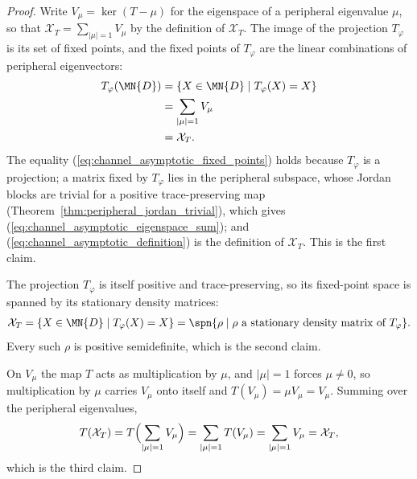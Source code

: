 \begin{proof}\leanok
    Write $V_\mu=\ker(T-\mu)$ for the eigenspace of a peripheral eigenvalue
    $\mu$, so that $\mathcal X_T=\sum_{|\mu|=1}V_\mu$ by the definition of
    $\mathcal X_T$. The image of the projection $T_\varphi$ is its set of
    fixed points, and the fixed points of $T_\varphi$ are the linear
    combinations of peripheral eigenvectors:
    \begin{align}
        T_\varphi(\MN{D})
         & =\{X\in\MN{D}\mid T_\varphi(X)=X\}
        \label{eq:channel_asymptotic_fixed_points}\\
         & =\sum_{|\mu|=1}V_\mu
        \label{eq:channel_asymptotic_eigenspace_sum}\\
         & =\mathcal X_T.
        \label{eq:channel_asymptotic_definition}
    \end{align}
    The equality (\ref{eq:channel_asymptotic_fixed_points}) holds because
    $T_\varphi$ is a projection; a matrix fixed by $T_\varphi$ lies in the
    peripheral subspace, whose Jordan blocks are trivial for a positive
    trace-preserving map (Theorem~\ref{thm:peripheral_jordan_trivial}),
    which gives (\ref{eq:channel_asymptotic_eigenspace_sum}); and
    (\ref{eq:channel_asymptotic_definition}) is the definition of
    $\mathcal X_T$. This is the first claim.

    The projection $T_\varphi$ is itself positive and trace-preserving, so its
    fixed-point space is spanned by its stationary density matrices:
    \begin{align}
        \mathcal X_T=\{X\in\MN{D}\mid T_\varphi(X)=X\}
        =\spn\{\rho\mid \rho\ \text{a stationary density matrix of }T_\varphi\}.
    \end{align}
    Every such $\rho$ is positive semidefinite, which is the second claim.

    On $V_\mu$ the map $T$ acts as multiplication by $\mu$, and $|\mu|=1$
    forces $\mu\neq0$, so multiplication by $\mu$ carries $V_\mu$ onto itself
    and $T(V_\mu)=\mu V_\mu=V_\mu$. Summing over the peripheral eigenvalues,
    \begin{align}
        T(\mathcal X_T)=T\Bigl(\sum_{|\mu|=1}V_\mu\Bigr)
        =\sum_{|\mu|=1}T(V_\mu)=\sum_{|\mu|=1}V_\mu=\mathcal X_T,
    \end{align}
    which is the third claim.
\end{proof}

